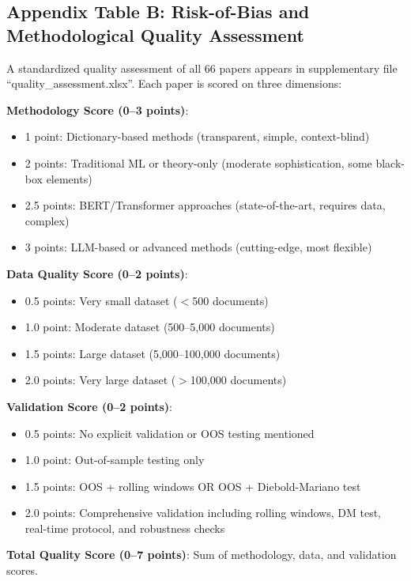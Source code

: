 \vspace{1em}

\subsection*{Appendix Table B: Risk-of-Bias and Methodological Quality Assessment}

A standardized quality assessment of all 66 papers appears in supplementary file ``quality_assessment.xlsx''. Each paper is scored on three dimensions:

\textbf{Methodology Score (0--3 points)}:
\begin{itemize}
\item 1 point: Dictionary-based methods (transparent, simple, context-blind)
\item 2 points: Traditional ML or theory-only (moderate sophistication, some black-box elements)
\item 2.5 points: BERT/Transformer approaches (state-of-the-art, requires data, complex)
\item 3 points: LLM-based or advanced methods (cutting-edge, most flexible)
\end{itemize}

\textbf{Data Quality Score (0--2 points)}:
\begin{itemize}
\item 0.5 points: Very small dataset ($<$500 documents)
\item 1.0 point: Moderate dataset (500--5,000 documents)
\item 1.5 points: Large dataset (5,000--100,000 documents)
\item 2.0 points: Very large dataset ($>$100,000 documents)
\end{itemize}

\textbf{Validation Score (0--2 points)}:
\begin{itemize}
\item 0.5 points: No explicit validation or OOS testing mentioned
\item 1.0 point: Out-of-sample testing only
\item 1.5 points: OOS + rolling windows OR OOS + Diebold-Mariano test
\item 2.0 points: Comprehensive validation including rolling windows, DM test, real-time protocol, and robustness checks
\end{itemize}

\textbf{Total Quality Score (0--7 points)}: Sum of methodology, data, and validation scores. 

